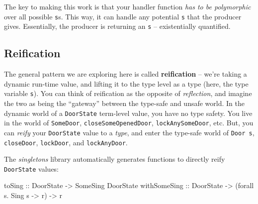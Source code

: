 \documentclass[]{article}
\newenvironment{Shaded}{}{}
\newcommand{\KeywordTok}[1]{\textcolor[rgb]{0.00,0.44,0.13}{\textbf{#1}}}
\newcommand{\DataTypeTok}[1]{\textcolor[rgb]{0.56,0.13,0.00}{#1}}
\newcommand{\StringTok}[1]{\textcolor[rgb]{0.25,0.44,0.63}{#1}}
\newcommand{\OtherTok}[1]{\textcolor[rgb]{0.00,0.44,0.13}{#1}}
\newcommand{\FunctionTok}[1]{\textcolor[rgb]{0.02,0.16,0.49}{#1}}
\newcommand{\NormalTok}[1]{#1}
\begin{document}
\begin{Shaded}
\end{Shaded}

The key to making this work is that your handler function \emph{has to be
polymorphic} over all possible \texttt{s}s. This way, it can handle any
potential \texttt{s} that the producer gives. Essentially, the producer is
returning an \texttt{s} -- existentially quantified.

\subsection{Reification}\label{reification}

The general pattern we are exploring here is called \textbf{reification} --
we're taking a dynamic run-time value, and lifting it to the type level as a
type (here, the type variable \texttt{s}). You can think of reification as the
opposite of \emph{reflection}, and imagine the two as being the ``gateway''
between the type-safe and unsafe world. In the dynamic world of a
\texttt{DoorState} term-level value, you have no type safety. You live in the
world of \texttt{SomeDoor}, \texttt{closeSomeOpenedDoor},
\texttt{lockAnySomeDoor}, etc. But, you can \emph{reify} your \texttt{DoorState}
value to a \emph{type}, and enter the type-safe world of \texttt{Door\ s},
\texttt{closeDoor}, \texttt{lockDoor}, and \texttt{lockAnyDoor}.

The \emph{singletons} library automatically generates functions to directly
reify \texttt{DoorState} values:

\begin{Shaded}
\begin{Highlighting}[]
\OtherTok{toSing       ::} \DataTypeTok{DoorState} \OtherTok{->} \DataTypeTok{SomeSing} \DataTypeTok{DoorState}
\OtherTok{withSomeSing ::} \DataTypeTok{DoorState} \OtherTok{->}\NormalTok{ (forall s}\FunctionTok{.} \DataTypeTok{Sing}\NormalTok{ s }\OtherTok{->}\NormalTok{ r) }\OtherTok{->}\NormalTok{ r}
\end{Highlighting}
\end{Shaded}
\end{document}
